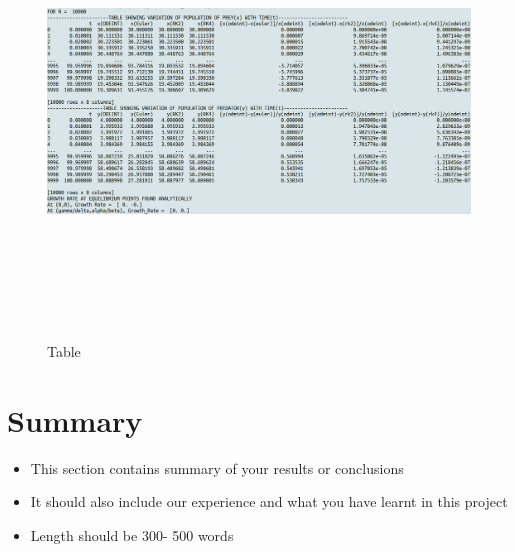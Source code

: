 \documentclass[12pt]{article}
\begin{document}
\newpage
\begin{figure}[h] %
    \centering
    \includegraphics[width=18cm,height=12cm]{table.png}
\caption{Table}
\end{figure}






\newpage
\section{Summary}
\label{sec:summary}
\begin{itemize}
    \item This section contains summary of your results or conclusions
    \item It should also include our experience and what you have learnt in this project
    \item Length should be 300- 500 words 
\end{itemize}


\newpage 
\appendix
\end{document}
